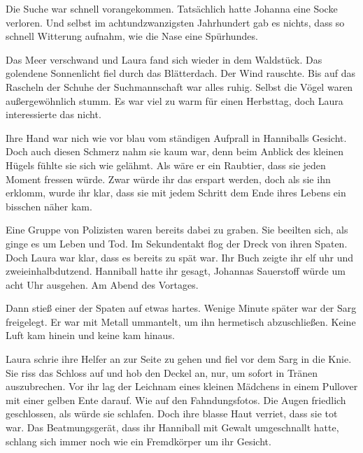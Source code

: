 Die Suche war schnell vorangekommen. Tatsächlich hatte Johanna eine Socke verloren. Und selbst im achtundzwanzigsten Jahrhundert gab es nichts, dass so schnell Witterung aufnahm, wie die Nase eine Spürhundes.

\par

Das Meer verschwand und Laura fand sich wieder in dem Waldstück. Das golendene Sonnenlicht fiel durch das Blätterdach. Der Wind rauschte. Bis auf das Rascheln der Schuhe der Suchmannschaft war alles ruhig. Selbst die Vögel waren außergewöhnlich stumm. Es war viel zu warm für einen Herbsttag, doch Laura interessierte das nicht.

\par

Ihre Hand war nich wie vor blau vom ständigen Aufprall in Hanniballs Gesicht. Doch auch diesen Schmerz nahm sie kaum war, denn beim Anblick des kleinen Hügels fühlte sie sich wie gelähmt. Als wäre er ein Raubtier, dass sie jeden Moment fressen würde. Zwar würde ihr das erspart werden, doch als sie ihn erklomm, wurde ihr klar, dass sie mit jedem Schritt dem Ende ihres Lebens ein bisschen näher kam.

\par

Eine Gruppe von Polizisten waren bereits dabei zu graben. Sie beeilten sich, als ginge es um Leben und Tod. Im Sekundentakt flog der Dreck von ihren Spaten. Doch Laura war klar, dass es bereits zu spät war. Ihr Buch zeigte ihr elf uhr und zweieinhalbdutzend. Hanniball hatte ihr gesagt, Johannas Sauerstoff würde um acht Uhr ausgehen. Am Abend des Vortages.

\par

Dann stieß einer der Spaten auf etwas hartes. Wenige Minute später war der Sarg freigelegt. Er war mit Metall ummantelt, um ihn hermetisch abzuschließen. Keine Luft kam hinein und keine kam hinaus.

\par

Laura schrie ihre Helfer an zur Seite zu gehen und fiel vor dem Sarg in die Knie. Sie riss das Schloss auf und hob den Deckel an, nur, um  sofort in Tränen auszubrechen. Vor ihr lag der Leichnam eines kleinen Mädchens in einem Pullover mit einer gelben Ente darauf. Wie auf den Fahndungsfotos. Die Augen friedlich geschlossen, als würde sie schlafen. Doch ihre blasse Haut verriet, dass sie tot war. Das Beatmungsgerät, dass ihr Hanniball mit Gewalt umgeschnallt hatte, schlang sich immer noch wie ein Fremdkörper um ihr Gesicht.

